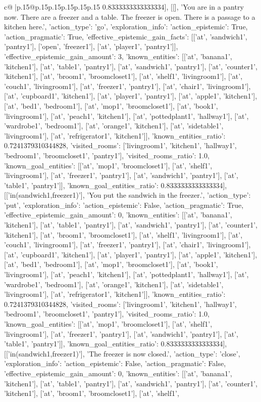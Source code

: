 \documentclass{article}
\begin{document}
{\begin{supertabular}{c@{$\;$}|p{.15\linewidth}@{}p{.15\linewidth}p{.15\linewidth}p{.15\linewidth}p{.15\linewidth}p{.15\linewidth}}
{{{0.8333333333333334}}], [[], 'You are in a pantry now. There are a freezer and a table. The freezer is open. There is a passage to a kitchen here.', {'action_type': 'go', 'exploration_info': {'action_epistemic': True, 'action_pragmatic': True, 'effective_epistemic_gain_facts': [['at', 'sandwich1', 'pantry1'], ['open', 'freezer1'], ['at', 'player1', 'pantry1']], 'effective_epistemic_gain_amount': 3, 'known_entities': [['at', 'banana1', 'kitchen1'], ['at', 'table1', 'pantry1'], ['at', 'sandwich1', 'pantry1'], ['at', 'counter1', 'kitchen1'], ['at', 'broom1', 'broomcloset1'], ['at', 'shelf1', 'livingroom1'], ['at', 'couch1', 'livingroom1'], ['at', 'freezer1', 'pantry1'], ['at', 'chair1', 'livingroom1'], ['at', 'cupboard1', 'kitchen1'], ['at', 'player1', 'pantry1'], ['at', 'apple1', 'kitchen1'], ['at', 'bed1', 'bedroom1'], ['at', 'mop1', 'broomcloset1'], ['at', 'book1', 'livingroom1'], ['at', 'peach1', 'kitchen1'], ['at', 'pottedplant1', 'hallway1'], ['at', 'wardrobe1', 'bedroom1'], ['at', 'orange1', 'kitchen1'], ['at', 'sidetable1', 'livingroom1'], ['at', 'refrigerator1', 'kitchen1']], 'known_entities_ratio': 0.7241379310344828, 'visited_rooms': ['livingroom1', 'kitchen1', 'hallway1', 'bedroom1', 'broomcloset1', 'pantry1'], 'visited_rooms_ratio': 1.0, 'known_goal_entities': [['at', 'mop1', 'broomcloset1'], ['at', 'shelf1', 'livingroom1'], ['at', 'freezer1', 'pantry1'], ['at', 'sandwich1', 'pantry1'], ['at', 'table1', 'pantry1']], 'known_goal_entities_ratio': 0.8333333333333334}}], [['in(sandwich1,freezer1)'], 'You put the sandwich in the freezer.', {'action_type': 'put', 'exploration_info': {'action_epistemic': False, 'action_pragmatic': True, 'effective_epistemic_gain_amount': 0, 'known_entities': [['at', 'banana1', 'kitchen1'], ['at', 'table1', 'pantry1'], ['at', 'sandwich1', 'pantry1'], ['at', 'counter1', 'kitchen1'], ['at', 'broom1', 'broomcloset1'], ['at', 'shelf1', 'livingroom1'], ['at', 'couch1', 'livingroom1'], ['at', 'freezer1', 'pantry1'], ['at', 'chair1', 'livingroom1'], ['at', 'cupboard1', 'kitchen1'], ['at', 'player1', 'pantry1'], ['at', 'apple1', 'kitchen1'], ['at', 'bed1', 'bedroom1'], ['at', 'mop1', 'broomcloset1'], ['at', 'book1', 'livingroom1'], ['at', 'peach1', 'kitchen1'], ['at', 'pottedplant1', 'hallway1'], ['at', 'wardrobe1', 'bedroom1'], ['at', 'orange1', 'kitchen1'], ['at', 'sidetable1', 'livingroom1'], ['at', 'refrigerator1', 'kitchen1']], 'known_entities_ratio': 0.7241379310344828, 'visited_rooms': ['livingroom1', 'kitchen1', 'hallway1', 'bedroom1', 'broomcloset1', 'pantry1'], 'visited_rooms_ratio': 1.0, 'known_goal_entities': [['at', 'mop1', 'broomcloset1'], ['at', 'shelf1', 'livingroom1'], ['at', 'freezer1', 'pantry1'], ['at', 'sandwich1', 'pantry1'], ['at', 'table1', 'pantry1']], 'known_goal_entities_ratio': 0.8333333333333334}}], [['in(sandwich1,freezer1)'], 'The freezer is now closed.', {'action_type': 'close', 'exploration_info': {'action_epistemic': False, 'action_pragmatic': False, 'effective_epistemic_gain_amount': 0, 'known_entities': [['at', 'banana1', 'kitchen1'], ['at', 'table1', 'pantry1'], ['at', 'sandwich1', 'pantry1'], ['at', 'counter1', 'kitchen1'], ['at', 'broom1', 'broomcloset1'], ['at', 'shelf1', }}}
\end{supertabular}}
\end{document}
